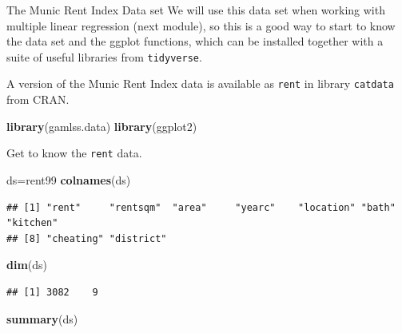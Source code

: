 \documentclass[
  ignorenonframetext,
]{beamer}
\newenvironment{Shaded}{\begin{snugshade}}{\end{snugshade}}
\newcommand{\FunctionTok}[1]{\textcolor[rgb]{0.13,0.29,0.53}{\textbf{#1}}}
\newcommand{\NormalTok}[1]{#1}
\newcommand{\OtherTok}[1]{\textcolor[rgb]{0.56,0.35,0.01}{#1}}
\begin{document}
\begin{frame}[fragile]
\begin{block}{The Munic Rent Index Data set}
\protect\hypertarget{the-munic-rent-index-data-set}{}
We will use this data set when working with multiple linear regression
(next module), so this is a good way to start to know the data set and
the ggplot functions, which can be installed together with a suite of
useful libraries from \texttt{tidyverse}.

A version of the Munic Rent Index data is available as \texttt{rent} in
library \texttt{catdata} from CRAN.

\begin{Shaded}
\begin{Highlighting}[]
\FunctionTok{library}\NormalTok{(gamlss.data)}
\FunctionTok{library}\NormalTok{(ggplot2)}
\end{Highlighting}
\end{Shaded}

Get to know the \texttt{rent} data.

\begin{Shaded}
\begin{Highlighting}[]
\NormalTok{ds}\OtherTok{=}\NormalTok{rent99}
\FunctionTok{colnames}\NormalTok{(ds)}
\end{Highlighting}
\end{Shaded}

\begin{verbatim}
## [1] "rent"     "rentsqm"  "area"     "yearc"    "location" "bath"     "kitchen" 
## [8] "cheating" "district"
\end{verbatim}

\begin{Shaded}
\begin{Highlighting}[]
\FunctionTok{dim}\NormalTok{(ds)}
\end{Highlighting}
\end{Shaded}

\begin{verbatim}
## [1] 3082    9
\end{verbatim}

\begin{Shaded}
\begin{Highlighting}[]
\FunctionTok{summary}\NormalTok{(ds)}
\end{Highlighting}
\end{Shaded}


\end{block}
\end{frame}
\end{document}
